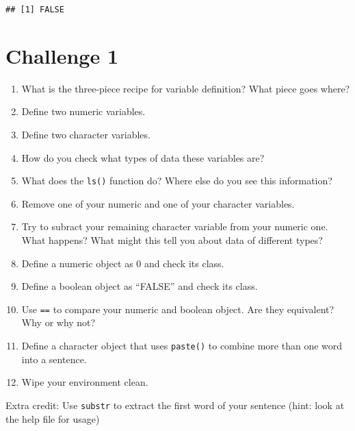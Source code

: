 \documentclass[]{article}
\providecommand{\tightlist}{%
  \setlength{\itemsep}{0pt}\setlength{\parskip}{0pt}}
\begin{document}
\begin{verbatim}
## [1] FALSE
\end{verbatim}

\section{\texorpdfstring{\textbf{Challenge
1}}{Challenge 1}}\label{challenge-1}

\begin{enumerate}
\def\labelenumi{\arabic{enumi}.}
\tightlist
\item
  What is the three-piece recipe for variable definition? What piece
  goes where?\\
\item
  Define two numeric variables.\\
\item
  Define two character variables.\\
\item
  How do you check what types of data these variables are?\\
\item
  What does the \texttt{ls()} function do? Where else do you see this
  information?\\
\item
  Remove one of your numeric and one of your character variables.\\
\item
  Try to subract your remaining character variable from your numeric
  one. What happens? What might this tell you about data of different
  types?\\
\item
  Define a numeric object as 0 and check its class.\\
\item
  Define a boolean object as ``FALSE'' and check its class.\\
\item
  Use \texttt{==} to compare your numeric and boolean object. Are they
  equivalent? Why or why not?\\
\item
  Define a character object that uses \texttt{paste()} to combine more
  than one word into a sentence.\\
\item
  Wipe your environment clean.
\end{enumerate}

Extra credit: Use \texttt{substr} to extract the first word of your
sentence (hint: look at the help file for usage)
\end{document}
